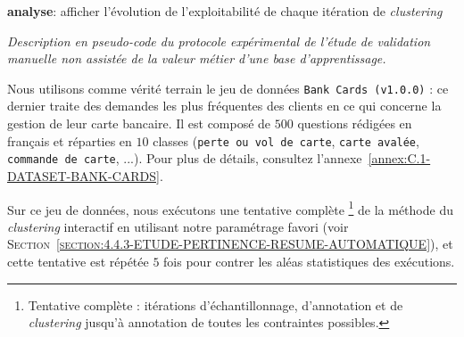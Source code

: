 			\begin{algorithm}
				\textbf{analyse}: afficher l'évolution de l'exploitabilité de chaque itération de \textit{clustering} \;
				\caption{\textit{
					Description en pseudo-code du protocole expérimental de l'étude de validation manuelle non assistée de la valeur métier d'une base d'apprentissage.
				}}
				\label{algorithm:4.4.1-ETUDE-PERTINENCE-VALIDATION-MANUELLE-PROTOCOLE}
			\end{algorithm}
			
			Nous utilisons comme vérité terrain le jeu de données \texttt{Bank Cards (v1.0.0)} : ce dernier traite des demandes les plus fréquentes des clients en ce qui concerne la gestion de leur carte bancaire.
			Il est composé de $500$ questions rédigées en français et réparties en $10$ classes (\texttt{perte ou vol de carte}, \texttt{carte avalée}, \texttt{commande de carte}, ...).
			Pour plus de détails, consultez l'annexe~\ref{annex:C.1-DATASET-BANK-CARDS}.
			
			Sur ce jeu de données, nous exécutons une tentative complète
			\footnote{Tentative complète : itérations d'échantillonnage, d'annotation et de \textit{clustering} jusqu'à annotation de toutes les contraintes possibles.}
			de la méthode du \textit{clustering} interactif en utilisant notre paramétrage favori (voir \textsc{Section~\ref{section:4.4.3-ETUDE-PERTINENCE-RESUME-AUTOMATIQUE}}), et cette tentative est répétée $5$ fois pour contrer les aléas statistiques des exécutions.
			
